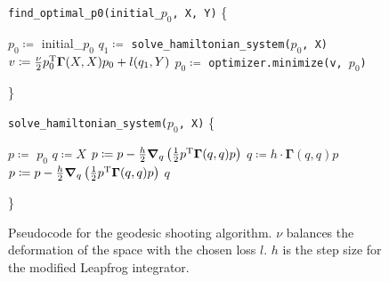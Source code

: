 \begin{figure}
	\centering
	\begin{minipage}{.45\linewidth}
		\scriptsize
		\begin{algorithmic}[1]
			\STATE \texttt{find\_optimal\_p0(initial\_$p_0$, X, Y)} \{
			\begin{ALC@g}
				\STATE $p_0 \coloneqq$ initial\_$p_0$
				 \label{code:p0-convergence}
				\STATE $q_1 \coloneqq$ \texttt{solve\_hamiltonian\_system($p_0$, X)}
				\STATE $v \coloneqq \frac{\nu}{2} p_0^{\mathrm{T}} \mathbf{\Gamma}(X, X)p_0 + l(q_1, Y)$
				\STATE $p_0 \coloneqq$ \texttt{optimizer.minimize(v, $p_0$)}
				\ENDWHILE
			\end{ALC@g}
			\STATE \}
		\end{algorithmic}
	\end{minipage}
	\hfill
	\begin{minipage}{.45\linewidth}
		\scriptsize
		\begin{algorithmic}[1]
			\STATE \texttt{solve\_hamiltonian\_system($p_0$, X)} \{
			\begin{ALC@g}
				\STATE $p \coloneqq$ $p_0$
				\STATE $q \coloneqq X$
				\FOR{$i \coloneqq 1$ to  $\mathrm{int}(\frac{1}{h})$}
				\STATE $p \coloneqq p - \frac{h}{2} \grad_q\left(\frac{1}{2}p^{\mathrm{T}}\mathbf{\Gamma}(q, q)p\right)$
				\STATE $q \coloneqq h \cdot \mathbf{\Gamma}(q,q) p$
				\STATE $p \coloneqq p - \frac{h}{2} \grad_q\left(\frac{1}{2}p^{\mathrm{T}}\mathbf{\Gamma}(q, q)p\right)$
				\ENDFOR
				\RETURN $q$
			\end{ALC@g}
			
			\STATE \}
		\end{algorithmic}
	\end{minipage}
	\caption{Pseudocode for the geodesic shooting algorithm. $\nu$ balances the deformation of the space with the chosen loss $l$. $h$ is the step size for the modified Leapfrog integrator.}
	\label{fig:algo}
\end{figure}